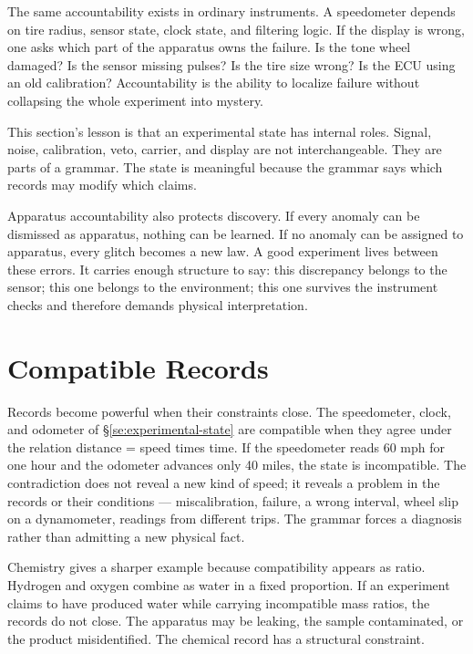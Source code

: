 The same accountability exists in ordinary instruments. A speedometer depends
on tire radius, sensor state, clock state, and filtering logic. If the display
is wrong, one asks which part of the apparatus owns the failure. Is the tone
wheel damaged? Is the sensor missing pulses? Is the tire size wrong? Is the ECU
using an old calibration? Accountability is the ability to localize failure
without collapsing the whole experiment into mystery.

This section's lesson is that an experimental state has internal roles. Signal,
noise, calibration, veto, carrier, and display are not interchangeable. They are
parts of a grammar. The state is meaningful because the grammar says which
records may modify which claims.

Apparatus accountability also protects discovery. If every anomaly can be
dismissed as apparatus, nothing can be learned. If no anomaly can be assigned to
apparatus, every glitch becomes a new law. A good experiment lives between
these errors. It carries enough structure to say: this discrepancy belongs to
the sensor; this one belongs to the environment; this one survives the
instrument checks and therefore demands physical interpretation.

\section{Compatible Records}
\label{se:compatible-records}

Records become powerful when their constraints close. The speedometer,
clock, and odometer of \S\ref{se:experimental-state} are compatible when
they agree under the relation distance = speed times time. If the
speedometer reads 60 mph for one hour and the odometer advances only 40
miles, the state is incompatible. The contradiction does not reveal a new
kind of speed; it reveals a problem in the records or their conditions ---
miscalibration, failure, a wrong interval, wheel slip on a dynamometer,
readings from different trips. The grammar forces a diagnosis rather than
admitting a new physical fact.

Chemistry gives a sharper example because compatibility appears as ratio.
Hydrogen and oxygen combine as water in a fixed proportion. If an experiment
claims to have produced water while carrying incompatible mass ratios, the
records do not close. The apparatus may be leaking, the sample contaminated, or
the product misidentified. The chemical record has a structural constraint.


